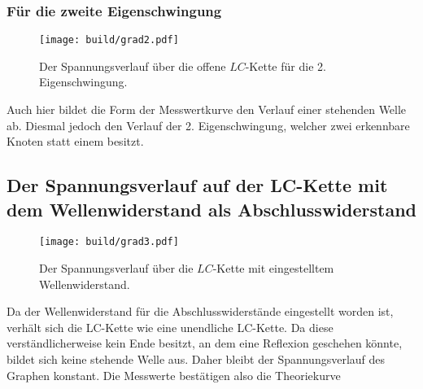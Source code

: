 \subsubsection{Für die zweite Eigenschwingung}
\begin{figure}[H]
	\centering
	\caption{Der Spannungsverlauf über die offene $LC$-Kette für die 2. Eigenschwingung.}
	\texttt{[image: build/grad2.pdf]}
	\label{fig:grad2}
\end{figure}
Auch hier bildet die Form der Messwertkurve den Verlauf einer stehenden Welle ab.
 Diesmal jedoch den Verlauf der 2. Eigenschwingung, welcher zwei erkennbare Knoten statt einem besitzt.

\subsection{Der Spannungsverlauf auf der LC-Kette mit dem Wellenwiderstand als Abschlusswiderstand}
\begin{figure}[H]
	\centering
	\caption{Der Spannungsverlauf über die $LC$-Kette mit eingestelltem Wellenwiderstand.}
	\texttt{[image: build/grad3.pdf]}
	\label{fig:grad3}
\end{figure}

Da der Wellenwiderstand für die Abschlusswiderstände eingestellt worden ist,
verhält sich die LC-Kette wie eine unendliche LC-Kette. Da diese verständlicherweise
 kein Ende besitzt, an dem eine Reflexion geschehen könnte, bildet sich keine stehende Welle aus.
  Daher bleibt der Spannungsverlauf des Graphen konstant. Die Messwerte
   bestätigen also die Theoriekurve
